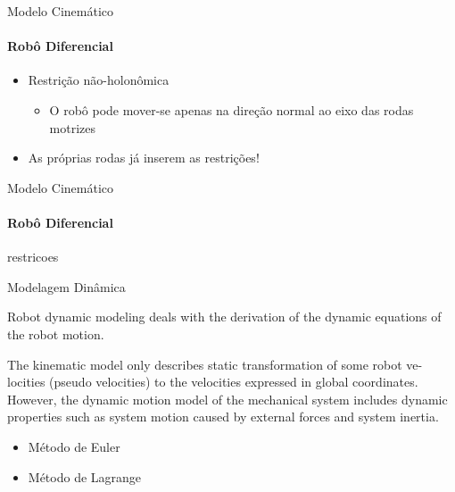 \documentclass{beamer}
\begin{document}
\begin{frame}{Modelo Cinemático}
    \framesubtitle{Robô Diferencial}
    \begin{itemize}
        \item Restrição não-holonômica
        \begin{itemize}
            \item O robô pode mover-se apenas na direção normal ao eixo das rodas motrizes
        \end{itemize}
    \item As próprias rodas já inserem as restrições!
    \end{itemize}
    \centering
    
\end{frame}


\begin{frame}{Modelo Cinemático}
    \framesubtitle{Robô Diferencial}
    restricoes
    
\end{frame}


\begin{frame}{Modelagem Dinâmica}

    Robot dynamic modeling deals with the derivation of the dynamic equations of the robot motion.

    \begin{block}{}
        The kinematic model only describes static transformation of some robot ve-
        locities (pseudo velocities) to the velocities expressed in global coordinates.
        However, the dynamic motion model of the mechanical system includes
        dynamic properties such as system motion caused by external forces and
        system inertia.
    \end{block}

    \begin{itemize}
        \item Método de Euler
        \item Método de Lagrange 
    \end{itemize}
\end{frame}
\end{document}
